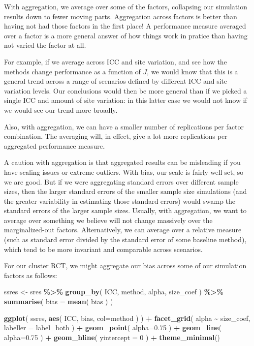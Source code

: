 \documentclass[
]{book}
\newenvironment{Shaded}{\begin{snugshade}}{\end{snugshade}}
\newcommand{\AttributeTok}[1]{\textcolor[rgb]{0.13,0.29,0.53}{#1}}
\newcommand{\DecValTok}[1]{\textcolor[rgb]{0.00,0.00,0.81}{#1}}
\newcommand{\FloatTok}[1]{\textcolor[rgb]{0.00,0.00,0.81}{#1}}
\newcommand{\FunctionTok}[1]{\textcolor[rgb]{0.13,0.29,0.53}{\textbf{#1}}}
\newcommand{\NormalTok}[1]{#1}
\newcommand{\OtherTok}[1]{\textcolor[rgb]{0.56,0.35,0.01}{#1}}
\newcommand{\SpecialCharTok}[1]{\textcolor[rgb]{0.81,0.36,0.00}{\textbf{#1}}}
\begin{document}
With aggregation, we average over some of the factors, collapsing our simulation results down to fewer moving parts.
Aggregation across factors is better than having not had those factors in the first place!
A performance measure averaged over a factor is a more general answer of how things work in pratice than having not varied the factor at all.

For example, if we average across ICC and site variation, and see how the methods change performance as a function of \(J\), we would know that this is a general trend across a range of scenarios defined by different ICC and site variation levels.
Our conclusions would then be more general than if we picked a single ICC and amount of site variation: in this latter case we would not know if we would see our trend more broadly.

Also, with aggregation, we can have a smaller number of replications per factor combination.
The averaging will, in effect, give a lot more replications per aggregated performance measure.

A caution with aggregation is that aggregated results can be misleading if you have scaling issues or extreme outliers.
With bias, our scale is fairly well set, so we are good.
But if we were aggregating standard errors over different sample sizes, then the larger standard errors of the smaller sample size simulations (and the greater variability in estimating those standard errors) would swamp the standard errors of the larger sample sizes.
Usually, with aggregation, we want to average over something we believe will not change massively over the marginalized-out factors.
Alternatively, we can average over a relative measure (such as standard error divided by the standard error of some baseline method), which tend to be more invariant and comparable across scenarios.

For our cluster RCT, we might aggregate our bias across some of our simulation factors as follows:

\begin{Shaded}
\begin{Highlighting}[]
\NormalTok{ssres }\OtherTok{\textless{}{-}} 
\NormalTok{  sres }\SpecialCharTok{\%\textgreater{}\%} 
  \FunctionTok{group\_by}\NormalTok{( ICC, method, alpha, size\_coef ) }\SpecialCharTok{\%\textgreater{}\%}
  \FunctionTok{summarise}\NormalTok{( }\AttributeTok{bias =} \FunctionTok{mean}\NormalTok{( bias ) )}

\FunctionTok{ggplot}\NormalTok{( ssres, }\FunctionTok{aes}\NormalTok{( ICC, bias, }\AttributeTok{col=}\NormalTok{method ) ) }\SpecialCharTok{+}
  \FunctionTok{facet\_grid}\NormalTok{( alpha }\SpecialCharTok{\textasciitilde{}}\NormalTok{  size\_coef, }\AttributeTok{labeller =}\NormalTok{ label\_both ) }\SpecialCharTok{+}
  \FunctionTok{geom\_point}\NormalTok{( }\AttributeTok{alpha=}\FloatTok{0.75}\NormalTok{ ) }\SpecialCharTok{+} 
  \FunctionTok{geom\_line}\NormalTok{( }\AttributeTok{alpha=}\FloatTok{0.75}\NormalTok{ ) }\SpecialCharTok{+}
  \FunctionTok{geom\_hline}\NormalTok{( }\AttributeTok{yintercept =} \DecValTok{0}\NormalTok{ ) }\SpecialCharTok{+}
  \FunctionTok{theme\_minimal}\NormalTok{()}
\end{Highlighting}
\end{Shaded}
\end{document}
